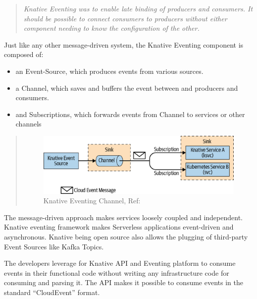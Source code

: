 \documentclass[12pt]{article}
\begin{document}
\begin{flushleft}
\begin{quote}
\textit{Knative Eventing was to enable late binding of producers and consumers. It should be possible to connect consumers to producers without either component needing to know the configuration of the other.}
\end{quote}
\begin{flushright}
\cite{cncf_to_host_cloudevents_in_the_sandbox_2023}
\end{flushright}
 \hfill\break   
Just like any other message-driven system, the Knative Eventing component is composed of:
\begin{itemize}
    \item an Event-Source, which produces events from various sources.
    \item a Channel, which saves and buffers the event between and producers and consumers.
    \item 	and Subscriptions, which forwards events from Channel to services or other channels
\end{itemize}
\begin{quote}
\begin{figure}[h]
    \centering
    \includegraphics[width=0.5\linewidth]{images/knative-event-channel.png}
    \caption{Knative Eventing Channel,  Ref: \cite{Sutter_Sampath_2020}}
    \end{figure}
\end{quote}

The message-driven approach makes services loosely coupled and independent. Knative eventing framework makes Serverless applications event-driven and asynchronous. Knative being open source also allows the plugging of third-party Event Sources like Kafka Topics. 

The developers leverage for Knative API and Eventing platform to consume events in their functional code without writing any infrastructure code for consuming and parsing it. The API makes it possible to consume events in the standard “CloudEvent” format. 
\end{flushleft}
\end{document}
